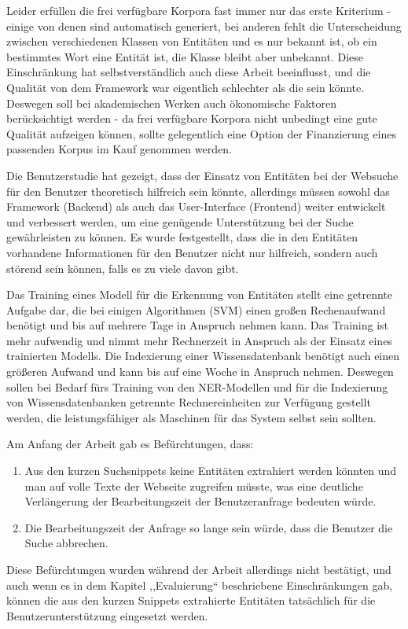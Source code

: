 Leider erfüllen die frei verfügbare Korpora fast immer nur das erste Kriterium - einige von denen sind automatisch generiert, bei anderen fehlt die Unterscheidung zwischen verschiedenen Klassen von Entitäten und es nur bekannt ist, ob ein bestimmtes Wort eine Entität ist, die Klasse bleibt aber unbekannt. Diese Einschränkung hat selbstverständlich auch diese Arbeit beeinflusst, und die Qualität von dem Framework war eigentlich schlechter als die sein könnte. Deswegen soll bei akademischen Werken auch ökonomische Faktoren berücksichtigt werden - da frei verfügbare Korpora nicht unbedingt eine gute Qualität aufzeigen können, sollte gelegentlich eine Option der Finanzierung eines passenden Korpus im Kauf genommen werden. 

Die Benutzerstudie hat gezeigt, dass der Einsatz von Entitäten bei der Websuche für den Benutzer theoretisch hilfreich sein könnte, allerdings müssen sowohl das Framework (Backend) als auch das User-Interface (Frontend) weiter entwickelt und verbessert werden, um eine genügende Unterstützung bei der Suche gewährleisten zu können. Es wurde festgestellt, dass die in den Entitäten vorhandene Informationen für den Benutzer nicht nur hilfreich, sondern auch störend sein können, falls es zu viele davon gibt.

Das Training eines Modell für die Erkennung von Entitäten stellt eine getrennte Aufgabe dar, die bei einigen Algorithmen (SVM) einen großen Rechenaufwand benötigt und bis auf mehrere Tage in Anspruch nehmen kann. Das Training ist mehr aufwendig und nimmt mehr Rechnerzeit in Anspruch als der Einsatz eines trainierten Modells. Die Indexierung einer Wissensdatenbank benötigt auch einen größeren Aufwand und kann bis auf eine Woche in Anspruch nehmen. Deswegen sollen bei Bedarf fürs Training von den NER-Modellen und für die Indexierung von Wissensdatenbanken getrennte Rechnereinheiten zur Verfügung gestellt werden, die leistungsfähiger als Maschinen für das System selbst sein sollten.   

Am Anfang der Arbeit gab es Befürchtungen, dass:
\begin{enumerate}
\item Aus den kurzen Suchsnippets keine Entitäten extrahiert werden könnten und man auf volle Texte der Webseite zugreifen müsste, was eine deutliche Verlängerung der Bearbeitungszeit der Benutzeranfrage bedeuten würde.
\item Die Bearbeitungszeit der Anfrage so lange sein würde, dass die Benutzer die Suche abbrechen.
\end{enumerate}
Diese Befürchtungen wurden während der Arbeit allerdings nicht bestätigt, und auch wenn es in dem Kapitel ,,Evaluierung`` beschriebene Einschränkungen gab, können die aus den kurzen Snippets extrahierte Entitäten tatsächlich für die Benutzerunterstützung eingesetzt werden. 

